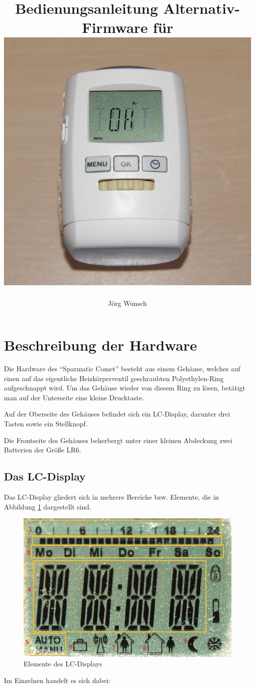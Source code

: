 \documentclass[a4paper]{article}
\title {
  Bedienungsanleitung Alternativ-Firmware für \SC\\
  \vspace*{1cm}
  {\centering\includegraphics[width=0.63\linewidth]{Comet.jpg}}
}
\author {
Jörg Wunsch
}
\newcommand\SC{"`Sparmatic Comet"' }
\begin{document}
\maketitle
\thispagestyle{empty}
\pagebreak


\section {
Beschreibung der Hardware
}

Die Hardware des \SC besteht aus einem Gehäuse, welches auf einen auf
das eigentliche Heizkörperventil geschraubten Polyethylen-Ring
aufgeschnappt wird.  Um das Gehäuse wieder von diesem Ring zu lösen,
betätigt man auf der Unterseite eine kleine Drucktaste.

Auf der Oberseite des Gehäuses befindet sich ein LC-Display, darunter
drei Tasten sowie ein Stellknopf.

Die Frontseite des Gehäuses beherbergt unter einer kleinen Abdeckung zwei
Batterien der Größe LR6.

\subsection {
  Das LC-Display
}

Das LC-Display gliedert sich in mehrere Bereiche bzw. Elemente, die in
Abbildung \ref{fig:LCD} dargestellt sind.

\begin{figure}[h]
\centering\includegraphics[width=0.5\linewidth]{LCD.jpg}
\caption{Elemente des LC-Displays}
\label{fig:LCD}
\end{figure}

Im Einzelnen handelt es sich dabei:
\end{document}
